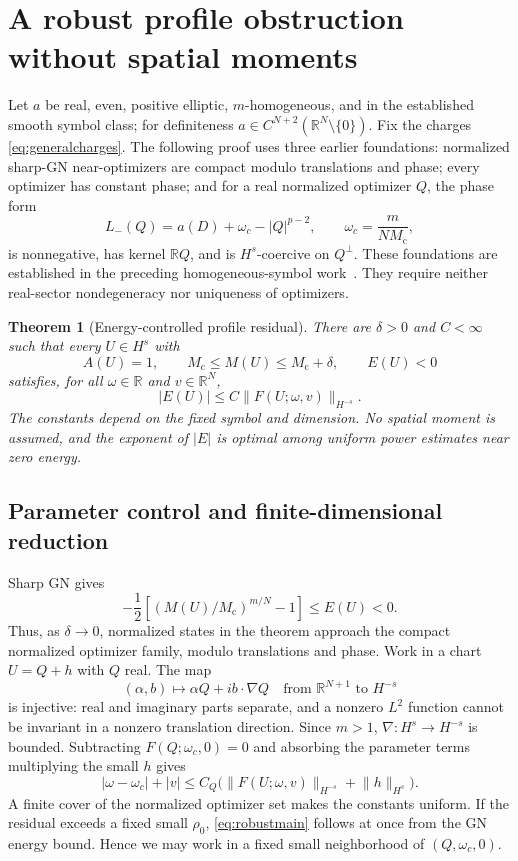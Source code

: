 \documentclass[11pt]{article}
\newtheorem{theorem}{Theorem}[section]
\theoremstyle{definition}
\theoremstyle{remark}
\newcommand{\R}{\mathbb R}
\newcommand{\norm}[1]{\lVert #1\rVert}
\newcommand{\mc}{M_{\mathrm c}}
\begin{document}
\section{A robust profile obstruction without spatial moments}\label{sec:robust}

Let $a$ be real, even, positive elliptic, $m$-homogeneous, and in the established smooth symbol class; for definiteness $a\in C^{N+2}(\R^N\setminus\{0\})$. Fix the charges \eqref{eq:generalcharges}. The following proof uses three earlier foundations: normalized sharp-GN near-optimizers are compact modulo translations and phase; every optimizer has constant phase; and for a real normalized optimizer $Q$, the phase form
\begin{equation}\label{eq:phaseform}
 L_-(Q)=a(D)+\omega_c-|Q|^{p-2},\qquad
 \omega_c=\frac{m}{N\mc},
\end{equation}
is nonnegative, has kernel $\R Q$, and is $H^s$-coercive on $Q^\perp$. These foundations are established in the preceding homogeneous-symbol work~\cite{ProjectR10}. They require neither real-sector nondegeneracy nor uniqueness of optimizers.

\begin{theorem}[Energy-controlled profile residual]\label{thm:robust}
There are $\delta>0$ and $C<\infty$ such that every $U\in H^s$ with
\[
 A(U)=1,\qquad \mc\le M(U)\le\mc+\delta,\qquad E(U)<0
\]
satisfies, for all $\omega\in\R$ and $v\in\R^N$,
\begin{equation}\label{eq:robustmain}
 |E(U)|\le C\norm{F(U;\omega,v)}_{H^{-s}}.
\end{equation}
The constants depend on the fixed symbol and dimension. No spatial moment is assumed, and the exponent of $|E|$ is optimal among uniform power estimates near zero energy.
\end{theorem}

\subsection{Parameter control and finite-dimensional reduction}

Sharp GN gives
\[
 -\frac12\left[(M(U)/\mc)^{m/N}-1\right]\le E(U)<0.
\]
Thus, as $\delta\to0$, normalized states in the theorem approach the compact normalized optimizer family, modulo translations and phase. Work in a chart $U=Q+h$ with $Q$ real. The map
\[
 (\alpha,b)\longmapsto\alpha Q+ib\cdot\nabla Q
 \quad\text{from }\R^{N+1}\text{ to }H^{-s}
\]
is injective: real and imaginary parts separate, and a nonzero $L^2$ function cannot be invariant in a nonzero translation direction. Since $m>1$, $\nabla:H^s\to H^{-s}$ is bounded. Subtracting $F(Q;\omega_c,0)=0$ and absorbing the parameter terms multiplying the small $h$ gives
\begin{equation}\label{eq:paramcontrol}
 |\omega-\omega_c|+|v|
 \le C_Q\bigl(\norm{F(U;\omega,v)}_{H^{-s}}+\norm h_{H^s}\bigr).
\end{equation}
A finite cover of the normalized optimizer set makes the constants uniform. If the residual exceeds a fixed small $\rho_0$, \eqref{eq:robustmain} follows at once from the GN energy bound. Hence we may work in a fixed small neighborhood of $(Q,\omega_c,0)$.
\end{document}
